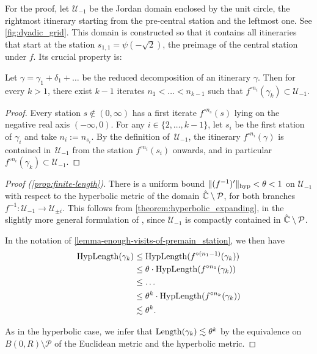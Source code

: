 For the proof, let $\mathcal U_{-1}$ be the Jordan domain enclosed by the unit circle, 
the rightmost itinerary starting from the pre-central station and the leftmost one. 
See \cref{fig:dyadic_grid}.
This domain is constructed so that it contains all itineraries that start at the station 
$s_{1,1} = \psi(-\sqrt{2})$, the preimage of the central station under $f$. Its crucial property is: 

\begin{lemma} \label{lemma-enough-visits-of-premain_station}
	Let $\gamma = \gamma_1 + \delta_1 + \dots $ be the reduced decomposition of an itinerary $\gamma$. Then for every $k > 1$, there exist $k-1$ iterates $n_1 < \dots < n_{k-1}$ such that $f^{\circ {n_i}}(\gamma_k) \subset \mathcal U_{-1}$. %
\end{lemma}

\begin{proof}
	Every station $s \not \in (0, \infty)$ has a first iterate $f^{\circ n_s}(s)$ lying on the negative real axis $(-\infty, 0)$.
	For any $i \in \{2, \dots, k-1\}$, let $s_i$ be the first station of $\gamma _i$ and take $n_i := n_{s_i}$.
	By the definition of $\,\mathcal U_{-1}$, the itinerary $f^{\circ n_i}(\gamma)$ is contained in  $\,\mathcal U_{-1}$ from the station $f^{\circ n_i}(s_i)$ onwards, and in particular $f^{\circ n_i}(\gamma_k) \subset \mathcal U_{-1}$.
\end{proof}
\begin{proof}[Proof (\cref{prop:finite-length})] 
There is a uniform bound $\Vert (f^{-1})' \Vert_{\operatorname{hyp}}< \theta < 1$ on $\mathcal U_{-1}$
with respect to the hyperbolic metric of the domain $\hat{\mathbb C} \setminus \operatorname{\mathcal P}$, for both branches $f^{-1}: \mathcal U_{-1} \to \mathcal U_{\pm i}$. 
This follows from \cref{theorem:hyperbolic_expanding}, in the slightly more general formulation of \cite[Theorem 3.5]{mcmullen_1994},
since $\mathcal U_{-1}$ is compactly contained in $\hat{\mathbb C} \setminus \operatorname{\mathcal P}$.

In the notation of \cref{lemma-enough-visits-of-premain_station}, we then have 
\begin{equation}
	\begin{split}
	\operatorname{HypLength}(\gamma_k)  &  \leq \operatorname{HypLength}(f^{\circ (n_1-1)}(\gamma_k)) \\ & \leq \theta \cdot \operatorname{HypLength}(f^{\circ n_1}(\gamma_k))\\ & \leq  \dots
	\\ & \leq \theta^k \cdot \operatorname{HypLength}(f^{\circ n_k}(\gamma_k))
		\\ & \lesssim \theta^k.
	\end{split}
\end{equation}

As in the hyperbolic case, we infer that $\operatorname{Length}(\gamma_k) \lesssim \theta^k$ 
by the equivalence on $B(0,R) \setminus \mathcal P$ 
of the Euclidean metric and the hyperbolic metric. 
\end{proof}



